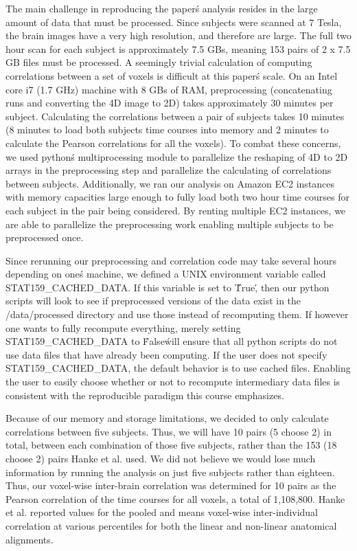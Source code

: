 The main challenge in reproducing the paper\'s analysis resides in the large
amount of data that must be processed. Since subjects were scanned at 7 Tesla,
the brain images have a very high resolution, and therefore are large. The
full two hour scan for each subject is approximately 7.5 GBs, meaning 153
pairs of 2 x 7.5 GB files must be processed. A seemingly trivial calculation
of computing correlations between a set of voxels is difficult at this paper\'s
scale. On an Intel core i7 (1.7 GHz) machine with 8 GBs of RAM, preprocessing
(concatenating runs and converting the 4D image to 2D) takes approximately 30
minutes per subject. Calculating the correlations between a pair of subjects
takes 10 minutes (8 minutes to load both subjects time courses into memory and
2 minutes to calculate the Pearson correlations for all the voxels).  To
combat these concerns, we used python\'s multiprocessing module to parallelize
the reshaping of 4D to 2D arrays in the preprocessing step and parallelize the
calculating of correlations between subjects. Additionally, we ran our
analysis on Amazon EC2 instances with memory capacities large enough to fully
load both two hour time courses for each subject in the pair being considered.
By renting multiple EC2 instances, we are able to parallelize the
preprocessing work enabling multiple subjects to be preprocessed once.

Since rerunning our preprocessing and correlation code may take several hours
depending on one\'s machine, we defined a UNIX environment variable called
STAT159\_CACHED\_DATA. If this variable is set to \'True\', then our python
scripts will look to see if preprocessed versions of the data exist in the
/data/processed directory and use those instead of recomputing them. If
however one wants to fully recompute everything, merely setting
STAT159\_CACHED\_DATA to \'False\' will ensure that all python scripts do not
use data files that have already been computing. If the user does not specify
STAT159\_CACHED\_DATA, the default behavior is to use cached files. Enabling
the user to easily choose whether or not to recompute intermediary data files
is consistent with the reproducible paradigm this course emphasizes.

Because of our memory and storage limitations, we decided to only calculate 
correlations between five subjects.  Thus, we will have 10 pairs (5 choose 2) 
in total, between each combination of those five subjects, rather than the 153
(18 choose 2) pairs Hanke et al. used.  We did not believe we would lose much
information by running the analysis on just five subjects rather than eighteen.
Thus, our voxel-wise inter-brain correlation was determined for 10 pairs as the 
Pearson correlation of the time courses for all voxels, a total of 1,108,800.
Hanke et al. reported values for the pooled and means voxel-wise inter-individual 
correlation at various percentiles for both the linear and non-linear 
anatomical alignments.  

